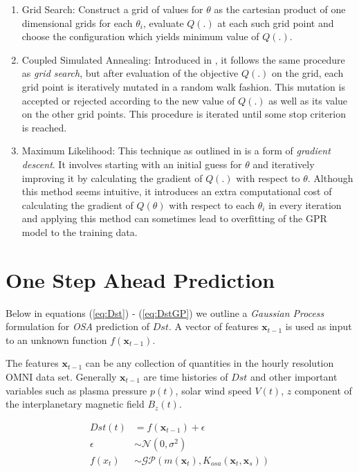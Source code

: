 \documentclass[sw, draft]{AGUTeX}
\begin{document}
\begin{article}
\begin{enumerate}
\item Grid Search: Construct a grid of values for $\theta$ as the cartesian product of one dimensional grids for each $\theta_i$, evaluate $Q(.)$ at each such grid point and choose the configuration which yields minimum value of $Q(.)$.

\item Coupled Simulated Annealing: Introduced in \citet{Xavier-De-Souza2010}, it follows the same procedure as \emph{grid search}, but after evaluation of the objective $Q(.)$ on the grid, each grid point is iteratively mutated in a random walk fashion. This mutation is accepted or rejected according to the new value of $Q(.)$ as well as its value on the other grid points. This procedure is iterated until some stop criterion is reached.

\item Maximum Likelihood: This technique as outlined in \citet{Rasmussen:2005:GPM:1162254} is a form of \emph{gradient descent}. It involves starting with an initial guess for $\theta$ and iteratively improving it by calculating the gradient of $Q(.)$ with respect to $\theta$. Although this method seems intuitive, it introduces an extra computational cost of calculating the gradient of $Q(\theta)$ with respect to each $\theta_i$ in every iteration and applying this method can sometimes lead to overfitting of the GPR model to the training data.

\end{enumerate}

\section{One Step Ahead Prediction} \label{sec:osa}

Below in equations (\ref{eq:Dst}) - (\ref{eq:DstGP}) we outline a \emph{Gaussian Process} formulation for \emph{OSA} prediction of $Dst$. A vector of features $\mathbf{x}_{t-1}$ is used as input to an unknown function $f(\mathbf{x}_{t-1})$.

The features $\mathbf{x}_{t-1}$ can be any collection of quantities in the hourly resolution OMNI data set. Generally $\mathbf{x}_{t-1}$ are time histories of $Dst$ and other important variables such as plasma pressure $p(t)$, solar wind speed $V(t)$, $z$ component of the interplanetary magnetic field $B_z(t)$.


\begin{align}
    Dst(t) & =  f(\mathbf{x}_{t-1}) + \epsilon \label{eq:Dst} \\
    \epsilon & \sim  \mathcal{N}(0, \sigma^2) \label{eq:GPNoise} \\
    f(x_t) & \sim  \mathcal{GP}(m(\mathbf{x}_t), K_{osa}(\mathbf{x}_t, \mathbf{x}_s)) \label{eq:DstGP} \\
\end{align}


\end{article}
\end{document}

